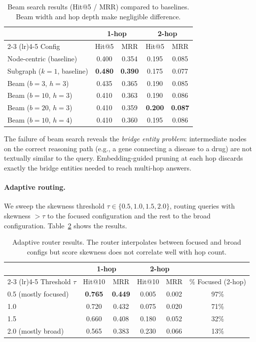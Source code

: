 \documentclass[11pt]{article}
\begin{document}
\begin{table}[h]
\centering
\caption{Beam search results (Hit@5 / MRR) compared to baselines. Beam width and hop depth make negligible difference.}
\label{tab:beam_results}
\begin{tabular}{l cc cc}
\toprule
& \multicolumn{2}{c}{1-hop} & \multicolumn{2}{c}{2-hop} \\
\cmidrule(lr){2-3} \cmidrule(lr){4-5}
Config & Hit@5 & MRR & Hit@5 & MRR \\
\midrule
Node-centric (baseline) & 0.400 & 0.354 & 0.195 & 0.085 \\
Subgraph ($k{=}1$, baseline) & \textbf{0.480} & \textbf{0.390} & 0.175 & 0.077 \\
\midrule
Beam ($b{=}3$, $h{=}3$) & 0.435 & 0.365 & 0.190 & 0.085 \\
Beam ($b{=}10$, $h{=}3$) & 0.410 & 0.363 & 0.190 & 0.086 \\
Beam ($b{=}20$, $h{=}3$) & 0.410 & 0.359 & \textbf{0.200} & \textbf{0.087} \\
Beam ($b{=}10$, $h{=}4$) & 0.410 & 0.360 & 0.195 & 0.086 \\
\bottomrule
\end{tabular}
\end{table}

The failure of beam search reveals the \textit{bridge entity problem}: intermediate nodes on the correct reasoning path (e.g., a gene connecting a disease to a drug) are not textually similar to the query. Embedding-guided pruning at each hop discards exactly the bridge entities needed to reach multi-hop answers.

\paragraph{Adaptive routing.} We sweep the skewness threshold $\tau \in \{0.5, 1.0, 1.5, 2.0\}$, routing queries with skewness $> \tau$ to the focused configuration and the rest to the broad configuration. Table~\ref{tab:adaptive_results} shows the results.

\begin{table}[h]
\centering
\caption{Adaptive router results. The router interpolates between focused and broad configs but score skewness does not correlate well with hop count.}
\label{tab:adaptive_results}
\begin{tabular}{l cc cc c}
\toprule
& \multicolumn{2}{c}{1-hop} & \multicolumn{2}{c}{2-hop} & \\
\cmidrule(lr){2-3} \cmidrule(lr){4-5}
Threshold $\tau$ & Hit@10 & MRR & Hit@10 & MRR & \% Focused (2-hop) \\
\midrule
0.5 (mostly focused) & \textbf{0.765} & \textbf{0.449} & 0.005 & 0.002 & 97\% \\
1.0 & 0.720 & 0.432 & 0.075 & 0.020 & 71\% \\
1.5 & 0.660 & 0.408 & 0.180 & 0.052 & 32\% \\
2.0 (mostly broad) & 0.565 & 0.383 & 0.230 & 0.066 & 13\% \\
\bottomrule
\end{tabular}
\end{table}
\end{document}
